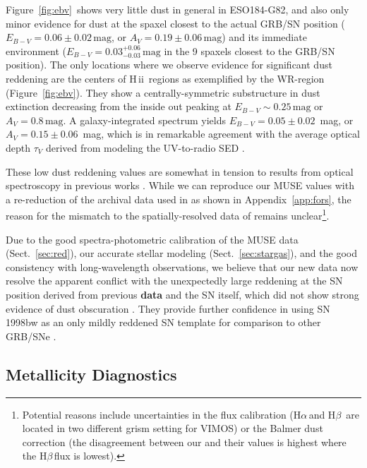 \documentclass[traditabstract]{aa}
\newcommand{\hb}{H$\beta$}
\newcommand{\ha}{H$\alpha$}
\newcommand{\hii}{\mbox{H\,{\sc ii}}}
\begin{document}
Figure~\ref{fig:ebv}~shows very little dust in general in ESO184-G82, and also only minor evidence for dust at the spaxel closest to the actual GRB/SN position ($E_{B-V} = 0.06\pm0.02\,\mathrm{mag}$, or $A_V = 0.19\pm0.06\,\mathrm{mag}$) and its immediate environment ($E_{B-V} = 0.03_{-0.03}^{+0.06}\,\mathrm{mag}$ in the 9 spaxels closest to the GRB/SN position). The only locations where we observe evidence for significant dust reddening are the centers of \hii\, regions as exemplified by the WR-region (Figure~\ref{fig:ebv}). They show a centrally-symmetric substructure in dust extinction decreasing from the inside out peaking at $E_{B-V} \sim 0.25\,\mathrm{mag}$ or $A_V = 0.8\,\mathrm{mag}$. A galaxy-integrated spectrum yields $E_{B-V} = 0.05\pm0.02$~mag, or $A_V=0.15\pm0.06$~mag, which is in remarkable agreement with the average optical depth $\tau_V$ derived from modeling the UV-to-radio SED \citep{2014A&A...562A..70M}.

These low dust reddening values are somewhat in tension to results from optical spectroscopy in previous works \citep{2006A&A...454..103H, 2008A&A...490...45C}. While we can reproduce our MUSE values with a re-reduction of the archival data used in \citet{2006A&A...454..103H} as shown in Appendix~\ref{app:fors}, the reason for the mismatch to the spatially-resolved data of \citet{2008A&A...490...45C} remains unclear\footnote{Potential reasons include uncertainties in the flux calibration (\ha\,and \hb\, are located in two different grism setting for VIMOS) or the Balmer dust correction (the disagreement between our and their values is highest where the \hb\,flux is lowest).}.

Due to the good spectra-photometric calibration of the MUSE data (Sect.~\ref{sec:red}), our accurate stellar modeling (Sect.~\ref{sec:stargas}), and the good consistency with long-wavelength observations, we believe that our new data now resolve the apparent conflict with the unexpectedly large reddening at the SN position derived from previous \textbf{data} and the SN itself, which did not show strong evidence of dust obscuration \citep[e.g.][]{1998Natur.395..672I, 2001ApJ...555..900P}. They provide further confidence in using SN\,1998bw as an only mildly reddened SN template for comparison to other GRB/SNe \citep[e.g.][and references therein]{2004ApJ...609..952Z, 2014A&A...566A.102S, 2016arXiv160606791K}.

\subsection{Metallicity Diagnostics}
\end{document}
